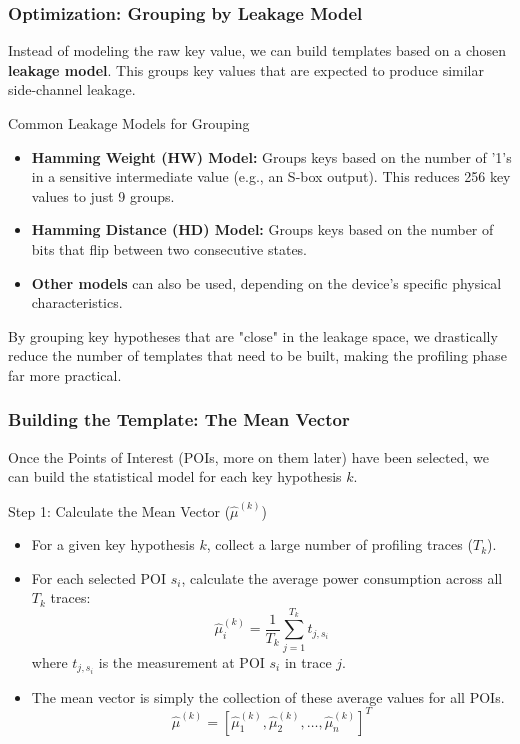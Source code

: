 \begin{frame}
    \frametitle{Optimization: Grouping by Leakage Model}
    
    Instead of modeling the raw key value, we can build templates based on a chosen \textbf{leakage model}. This groups key values that are expected to produce similar side-channel leakage.
    
    \begin{block}{Common Leakage Models for Grouping}
        \begin{itemize}
            \item \textbf{Hamming Weight (HW) Model:} Groups keys based on the number of '1's in a sensitive intermediate value (e.g., an S-box output). This reduces 256 key values to just 9 groups.
            
            \item \textbf{Hamming Distance (HD) Model:} Groups keys based on the number of bits that flip between two consecutive states.
            
            \item \textbf{Other models} can also be used, depending on the device's specific physical characteristics.
        \end{itemize}
    \end{block}
    
    \begin{alertblock}{}
        By grouping key hypotheses that are "close" in the leakage space, we drastically reduce the number of templates that need to be built, making the profiling phase far more practical.
    \end{alertblock}
    
\end{frame}

\begin{frame}
    \frametitle{Building the Template: The Mean Vector}
    
    Once the Points of Interest (POIs, more on them later) have been selected, we can build the statistical model for each key hypothesis $k$.
    
    \begin{block}{Step 1: Calculate the Mean Vector ($\hat{\mu}^{(k)}$)}
        \begin{itemize}
            \item For a given key hypothesis $k$, collect a large number of profiling traces ($T_k$).
            \item For each selected POI $s_i$, calculate the average power consumption across all $T_k$ traces:
            \[ \hat{\mu}_i^{(k)} = \frac{1}{T_k} \sum_{j=1}^{T_k} t_{j, s_i} \]
            where $t_{j, s_i}$ is the measurement at POI $s_i$ in trace $j$.
            
            \item The mean vector is simply the collection of these average values for all POIs.
            \[ \hat{\mu}^{(k)} = [\hat{\mu}_1^{(k)}, \hat{\mu}_2^{(k)}, \dots, \hat{\mu}_n^{(k)}]^T \]
        \end{itemize}
    \end{block}
  
\end{frame}

